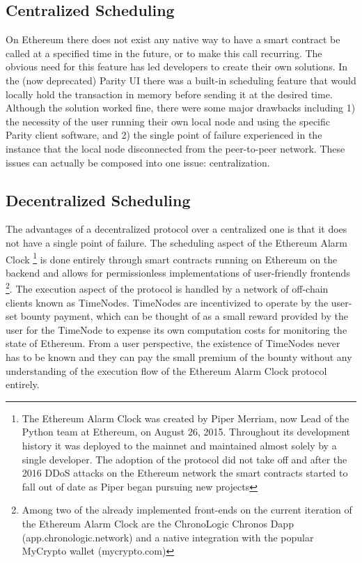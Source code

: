 \documentclass{article}
\begin{document}
  \subsection{Centralized Scheduling}
  On Ethereum there does not exist any native way to have a smart contract be called at a specified time in the future, or to make this call recurring. The obvious need for this feature has led developers to create their own solutions. In the (now deprecated) Parity UI there was a built-in scheduling feature that would locally hold the transaction in memory before sending it at the desired time. Although the solution worked fine, there were some major drawbacks including 1) the necessity of the user running their own local node and using the specific Parity client software, and 2) the single point of failure experienced in the instance that the local node disconnected from the peer-to-peer network. These issues can actually be composed into one issue: centralization.
  \subsection{Decentralized Scheduling}
  The advantages of a decentralized protocol over a centralized one is that it does not have a single point of failure. The scheduling aspect of the Ethereum Alarm Clock \footnote{The Ethereum Alarm Clock was created by Piper Merriam, now Lead of the Python team at Ethereum, on August 26, 2015. Throughout its development history it was deployed to the mainnet and maintained almost solely by a single developer. The adoption of the protocol did not take off and after the 2016 DDoS attacks on the Ethereum network the smart contracts started to fall out of date as Piper began pursuing new projects} is done entirely through smart contracts running on Ethereum on the backend and allows for permissionless implementations of user-friendly frontends \footnote{Among two of the already implemented front-ends on the current iteration of the Ethereum Alarm Clock are the ChronoLogic Chronos Dapp (app.chronologic.network) and a native integration with the popular MyCrypto wallet (mycrypto.com)}. The execution aspect of the protocol is handled by a network of off-chain clients known as TimeNodes. TimeNodes are incentivized to operate by the user-set bounty payment, which can be thought of as a small reward provided by the user for the TimeNode to expense its own computation costs for monitoring the state of Ethereum. From a user perspective, the existence of TimeNodes never has to be known and they can pay the small premium of the bounty without any understanding of the execution flow of the Ethereum Alarm Clock protocol entirely.
\end{document}
